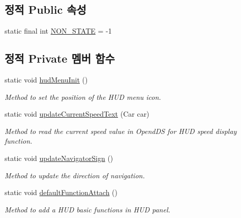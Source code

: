 \subsection*{정적 Public 속성}
\begin{DoxyCompactItemize}
\item 
static final int \hyperlink{classkr_1_1ac_1_1kookmin_1_1cs_1_1hud_1_1_h_u_d_management_aed0bc1b7b1fd78bb588e2321b44cb254}{N\+O\+N\+\_\+\+S\+T\+A\+T\+E} = -\/1
\end{DoxyCompactItemize}
\subsection*{정적 Private 멤버 함수}
\begin{DoxyCompactItemize}
\item 
static void \hyperlink{classkr_1_1ac_1_1kookmin_1_1cs_1_1hud_1_1_h_u_d_management_ae556ec9b1e304f6b7ac343d19186b31e}{hud\+Menu\+Init} ()
\begin{DoxyCompactList}\small\item\em Method to set the position of the H\+U\+D menu icon. \end{DoxyCompactList}\item 
static void \hyperlink{classkr_1_1ac_1_1kookmin_1_1cs_1_1hud_1_1_h_u_d_management_aeb454637f977e672b79282823b6b1cde}{update\+Current\+Speed\+Text} (Car car)
\begin{DoxyCompactList}\small\item\em Method to read the current speed value in Opend\+D\+S for H\+U\+D speed display function. \end{DoxyCompactList}\item 
static void \hyperlink{classkr_1_1ac_1_1kookmin_1_1cs_1_1hud_1_1_h_u_d_management_ae4cd0a7adf3e6e05e2c515bc4ec630ac}{update\+Navigator\+Sign} ()
\begin{DoxyCompactList}\small\item\em Method to update the direction of navigation. \end{DoxyCompactList}\item 
static void \hyperlink{classkr_1_1ac_1_1kookmin_1_1cs_1_1hud_1_1_h_u_d_management_a17e1d7f91f4334de06399c149d455781}{default\+Function\+Attach} ()
\begin{DoxyCompactList}\small\item\em Method to add a H\+U\+D basic functions in H\+U\+D panel. \end{DoxyCompactList}\end{DoxyCompactItemize}
